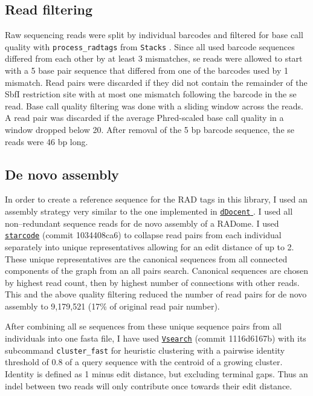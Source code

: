 \documentclass[a4paper,12pt,times,print,index,custombib,custommargin]{PhDThesisPSnPDF}\usepackage[]{graphicx}\usepackage[]{color}
\begin{document}
\subsection{Read filtering}
%
%
Raw sequencing reads were split by individual barcodes and filtered for base call quality with \texttt{process\_radtags} from \texttt{Stacks} \citep{Catchen2011}. Since all used barcode sequences differed from each other by at least 3 mismatches, \gls{se} reads were allowed to start with a 5 base pair sequence that differed from one of the barcodes used by 1 mismatch. Read pairs were discarded if they did not contain the remainder of the SbfI restriction site with at most one mismatch following the barcode in the \gls{se} read. Base call quality filtering was done with a sliding window across the reads. A read pair was discarded if the average Phred-scaled base call quality in a window dropped below 20. After removal of the 5 bp barcode sequence, the \gls{se} reads were 46 bp long.
%
%
\subsection{De novo assembly}
%
%
In order to create a reference sequence for the RAD tags in this library, I used an assembly strategy very similar to the one implemented in \href{https://github.com/jpuritz/dDocent}{\texttt{dDocent} }\citep{Puritz2014a}. I used all non--redundant sequence reads for de novo assembly of a RADome. I used \href{https://github.com/gui11aume/starcode}{\texttt{starcode}} (commit 1034408ca6) \citep{Zorita2015} to collapse read pairs from each individual separately into unique representatives allowing for an \gls{edit distance} of up to 2. These unique representatives are the canonical sequences from all \glspl{connected component} of the graph from an \gls{all pairs} search. Canonical sequences are chosen by highest read count, then by highest number of connections with other reads. This and the above quality filtering reduced the number of read pairs for de novo assembly to 9,179,521 (17\% of original read pair number).

After combining all \gls{se} sequences from these unique sequence pairs from all individuals into one fasta file, I have used \href{https://github.com/torognes/vsearch}{\texttt{Vsearch}} (commit 1116d6167b) \citep{Rognes2016} with its subcommand \texttt{cluster\_fast} for heuristic clustering with a pairwise identity threshold of 0.8 of a query sequence with the centroid of a growing cluster. Identity is defined as 1 minus \gls{edit distance}, but excluding terminal gaps. Thus an indel between two reads will only contribute once towards their edit distance.
\end{document}
